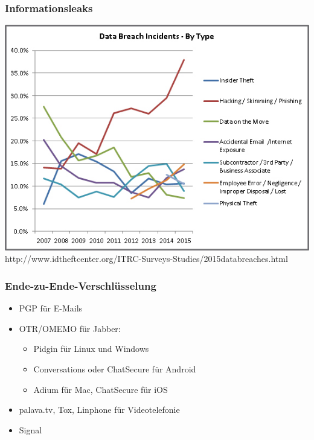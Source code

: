 \documentclass[12pt, xcolor={svgnames,table}]{beamer}
\begin{document}
\begin{frame}
    \frametitle{Informationsleaks}
    \begin{center}
      \includegraphics[height=0.7\textheight]{img/databreaches.jpg}\\
      http://www.idtheftcenter.org/ITRC-Surveys-Studies/2015databreaches.html
    \end{center}
\end{frame}

\begin{frame}
  \frametitle{Ende-zu-Ende-Verschlüsselung}
  \begin{itemize}
    \item<1-> PGP für E-Mails
    \item<2-> OTR/OMEMO für Jabber:
      \begin{itemize}
        \item Pidgin für Linux und Windows
        \item Conversations oder ChatSecure für Android
        \item Adium für Mac, ChatSecure für iOS
      \end{itemize}
    \item<3-> palava.tv, Tox, Linphone für Videotelefonie
    \item<4-> Signal
  \end{itemize}
\end{frame}
\end{document}
